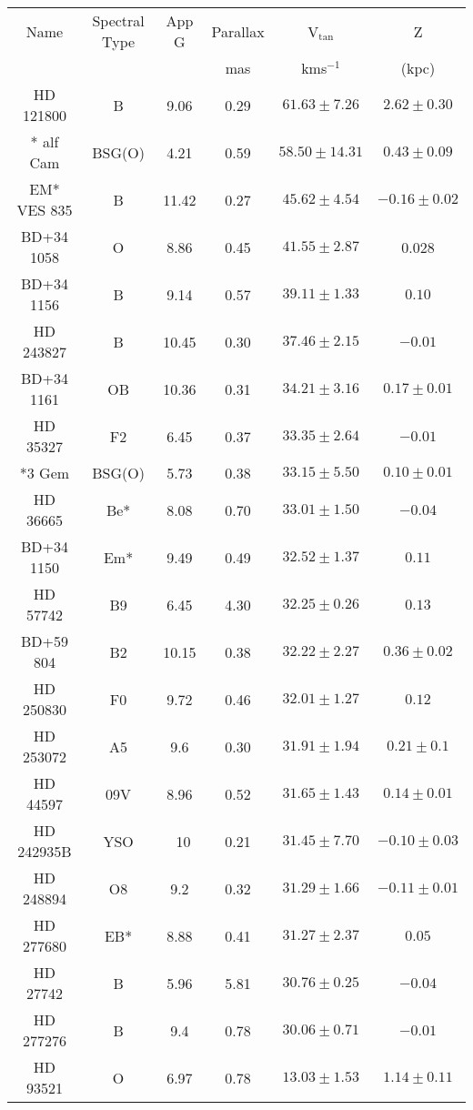 \documentclass[fleqn,usenatbib]{mnras}
\begin{document}
\begin{table}

 \begin{center}
\renewcommand{\arraystretch}{1.3}
\hspace*{-1cm}
\begin{tabular}{c c c c c c} 
\hline
\hline
Name & Spectral Type&App G&Parallax &V$_{\text{tan}}$ & Z \\
 &&&mas&kms$^{-1}$&  (kpc)\\
\hline
HD 121800 & B&9.06&0.29 & $61.63\pm 7.26$ &$2.62 \pm0.30$\\
* alf Cam& BSG(O)&4.21&0.59& $58.50\pm 14.31$ &$0.43 \pm0.09$\\
EM* VES  835& B&11.42& 0.27& $45.62\pm 4.54$ &$-0.16\pm0.02$\\
BD+34 1058 &O&8.86 &0.45 & $41.55 \pm  2.87$& 0.028  \\
BD+34 1156 & B&9.14& 0.57& $39.11 \pm  1.33$&$0.10$\\
HD 243827 &B&10.45 & 0.30 & $37.46 \pm 2.15$&$-0.01$\\
BD+34 1161&OB&10.36& 0.31& $34.21 \pm 3.16$&$0.17 \pm 0.01$\\
HD 35327 &F2&6.45& 0.37 & $33.35 \pm 2.64$ &$-0.01$\\
*3 Gem & BSG(O)&5.73 &0.38 & $33.15 \pm 5.50$&$0.10\pm 0.01$\\
HD 36665 & Be* & 8.08& 0.70 & $33.01 \pm 1.50$&$-0.04$\\
BD+34 1150 & Em* &9.49& 0.49& $32.52 \pm 1.37$ &$0.11$\\
HD 57742 &B9&6.45& 4.30 & $32.25 \pm  0.26$& $0.13$\\
BD+59 804&B2&10.15& 0.38 & $32.22 \pm  2.27$&$0.36 \pm 0.02$\\
HD 250830 & F0	&9.72&0.46& $32.01 \pm  1.27$&$0.12$\\
HD 253072 & A5&	9.6&0.30 & $31.91 \pm  1.94$&$0.21\pm0.1$ \\
HD 44597 &09V&	8.96 &0.52 & $31.65 \pm 1.43$&$0.14\pm0.01$\\
HD 242935B &YSO	&~10 &0.21 & $31.45 \pm  7.70$&$-0.10\pm0.03$\\
HD 248894&O8&9.2 & 0.32  &$31.29 \pm  1.66$&$-0.11\pm0.01$\\
HD 277680 &EB*	&8.88 &0.41&  $31.27\pm 2.37$&$0.05$ \\
HD  27742 &B &5.96 &5.81& $30.76 \pm 0.25 $&$-0.04$\\
HD 277276&B	&9.4 & 0.78&$30.06\pm 0.71$&$-0.01$\\
\hline
HD 93521 &O	&6.97 &0.78& $13.03\pm 1.53$& $1.14\pm 0.11$\\

\end{tabular}
\end{center}
\end{table}
\end{document}
